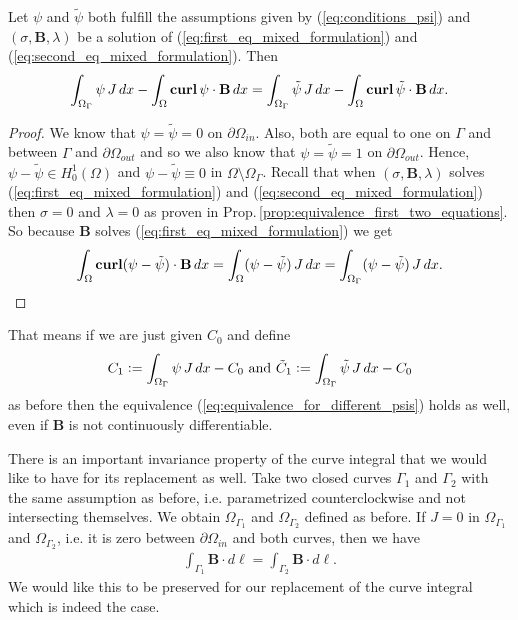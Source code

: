 \documentclass[../master_thesis.tex]{subfiles}
\begin{document}
\begin{proposition}\label{prop:different_psi_same_curve_integral}
    Let $\psi$ and $\tilde{\psi}$ both fulfill the assumptions given by (\ref{eq:conditions_psi})
    and $(\sigma, \mathbf{B}, \lambda)$ be a solution of (\ref{eq:first_eq_mixed_formulation}) and 
    (\ref{eq:second_eq_mixed_formulation}).
    Then 
    \begin{align}
        \int_{\Omega_\Gamma} \psi \, J \, dx -  \int_\Omega \veccurl \psi \cdot \mathbf{B} \, dx
        = \int_{\Omega_\Gamma} \tilde{\psi} \, J \, dx -  \int_\Omega \veccurl \tilde{\psi} \cdot \mathbf{B} \, dx.
        \label{eq:different_psi_same_curve_integral}
    \end{align}
\end{proposition}
\begin{proof}
    We know that $\psi = \tilde{\psi} = 0$ on $\partial \Omega_{in}$. Also,  
    both are equal to one on $\Gamma$ and between $\Gamma$ and $\partial \Omega_{out}$ and so we also 
    know that $\psi = \tilde{\psi} = 1$ on $\partial \Omega_{out}$. Hence, 
    $\psi - \tilde{\psi} \in H^1_0(\Omega)$ and $\psi - \tilde{\psi} \equiv 0$ 
    in $\Omega \setminus \Omega_\Gamma$. 
    Recall that when $(\sigma, \mathbf{B}, \lambda)$ solves 
    (\ref{eq:first_eq_mixed_formulation}) and (\ref{eq:second_eq_mixed_formulation}) 
    then $\sigma = 0$ and $\lambda = 0$ as proven in Prop.\,\ref{prop:equivalence_first_two_equations}.
    So because $\mathbf{B}$ solves 
    (\ref{eq:first_eq_mixed_formulation}) we get 
    \begin{align*}
        \int_\Omega \veccurl (\psi - \tilde{\psi}) \cdot \mathbf{B} \, dx
        = \int_\Omega (\psi - \tilde{\psi}) \, J \, dx 
        = \int_{\Omega_\Gamma} (\psi - \tilde{\psi}) \, J \, dx.
    \end{align*}
\end{proof}
That means if we are just given $C_0$ and define 
\begin{align*}
    C_1 \vcentcolon= \int_{\Omega_\Gamma} \psi \, J \, dx - C_0 \text{ and }
    \tilde{C}_1 \vcentcolon= \int_{\Omega_\Gamma} \tilde{\psi} \, J \, dx - C_0
\end{align*}
as before then the equivalence (\ref{eq:equivalence_for_different_psis}) holds as well, 
even if $\mathbf{B}$ is not continuously 
differentiable.

There is an important invariance property of the curve integral that we would like 
to have for its replacement as well. Take two closed curves $\Gamma_1$ and $\Gamma_2$ 
with the same assumption as before, i.e. parametrized counterclockwise and not intersecting 
themselves. We obtain $\Omega_{\Gamma_1}$ and $\Omega_{\Gamma_2}$ defined as before.
If $J = 0$ in $\Omega_{\Gamma_1}$ and $\Omega_{\Gamma_2}$, 
i.e. it is zero between $\partial \Omega_{in}$ and both curves,
then we have 
\begin{align}
    \int_{\Gamma_1} \mathbf{B} \cdot d\ell = \int_{\Gamma_2} \mathbf{B} \cdot d\ell.
\end{align}
We would like this to be preserved for our replacement of the curve integral 
which is indeed the case.
\end{document}
